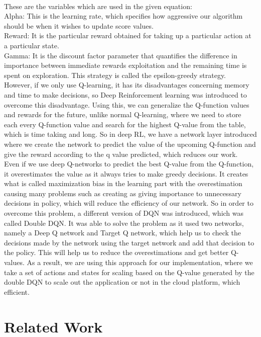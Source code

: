 \documentclass[conference]{IEEEtran}
\begin{document}
\\
These are the variables which are used in the given equation: 
\\
Alpha: This is the learning rate, which specifies how aggressive our algorithm should be when it wishes to update score values. 
\\
Reward: It is the particular reward obtained for taking up a particular action at a particular state. 
\\
Gamma: It is the discount factor parameter that quantifies the difference in importance between immediate rewards exploitation and the remaining time is spent on exploration. This strategy is called the epsilon-greedy strategy. 
\\
However, if we only use Q-learning, it has its disadvantages concerning memory and time to make decisions, so Deep Reinforcement learning was introduced to overcome this disadvantage. Using this, we can generalize the Q-function values and rewards for the future, unlike normal Q-learning, where we need to store each every Q-function value and search for the highest Q-value from the table, which is time taking and long. So in deep RL, we have a network layer introduced where we create the network to predict the value of the upcoming Q-function and give the reward according to the q value predicted, which reduces our work.
\\
Even if we use deep Q-networks to predict the best Q-value from the Q-function, it overestimates the value as it always tries to make greedy decisions. It creates what is called maximization bias in the learning part with the overestimation causing many problems such as creating as giving importance to unnecessary decisions in policy, which will reduce the efficiency of our network. So in order to overcome this problem, a different version of DQN was introduced, which was called Double DQN. It was able to solve the problem as it used two networks, namely a Deep Q network and Target  Q network, which help us to check the decisions made by the network using the target network and add that decision to the policy. This will help us to reduce the overestimations and get better Q-values. As a result, we are using this approach for our implementation, where we take a set of actions and states for scaling based on the Q-value generated by the double DQN to scale out the application or not in the cloud platform, which efficient. 
\\

\section*{Related Work}
\end{document}
